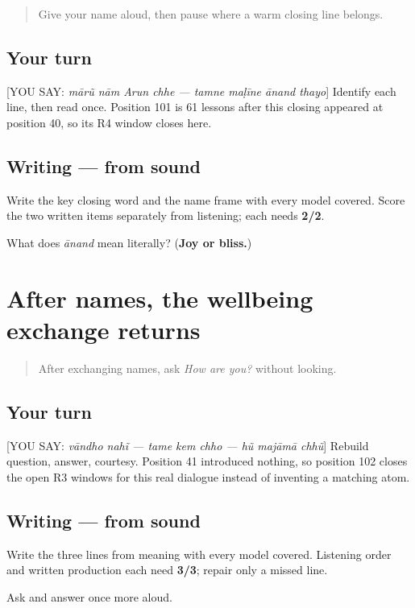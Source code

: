 \begin{quote}
Give your name aloud, then pause where a warm closing line belongs.
\end{quote}

\subsection*{Your turn}
{[}YOU SAY: \emph{mārũ nām Arun chhe — tamne maḷīne ānand thayo}{]} Identify each line, then read \textbf{   } once. Position 101 is 61 lessons after this closing appeared at position 40, so its R4 window closes here.

\subsection*{Writing — from sound}
Write the key closing word and the name frame with every model covered. Score the two written items separately from listening; each needs \textbf{2/2}.

\begin{tcolorbox}[breakable,colback=teal!4,colframe=teal!35!black,title={Before you move on}]
What does \emph{ānand} mean literally? (\textbf{Joy or bliss.})
\end{tcolorbox}
\section[Practice]{After names, the wellbeing exchange returns}

\label{lesson:GU-R16-wellbeing-r3}



\begin{quote}
After exchanging names, ask \emph{How are you?} without looking.
\end{quote}

\subsection*{Your turn}
{[}YOU SAY: \emph{vāndho nahĩ — tame kem chho — hũ majāmā chhũ}{]} Rebuild question, answer, courtesy. Position 41 introduced nothing, so position 102 closes the open R3 windows for this real dialogue instead of inventing a matching atom.

\subsection*{Writing — from sound}
Write the three lines from meaning with every model covered. Listening order and written production each need \textbf{3/3}; repair only a missed line.

\begin{tcolorbox}[breakable,colback=teal!4,colframe=teal!35!black,title={Before you move on}]
Ask and answer once more aloud.
\end{tcolorbox}
